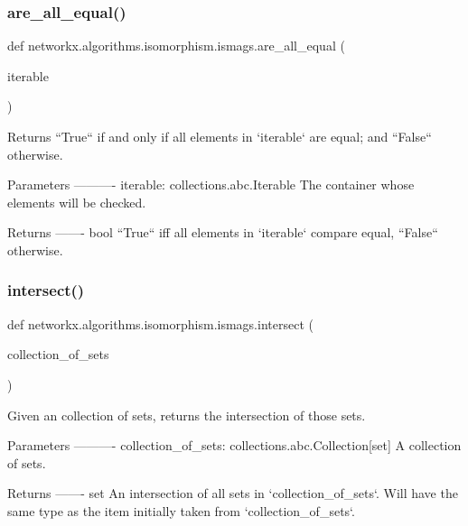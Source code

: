\subsubsection{\texorpdfstring{are\+\_\+all\+\_\+equal()}{are\_all\_equal()}}
{\footnotesize\ttfamily def networkx.\+algorithms.\+isomorphism.\+ismags.\+are\+\_\+all\+\_\+equal (\begin{DoxyParamCaption}\item[{}]{iterable }\end{DoxyParamCaption})}

\begin{DoxyVerb}Returns ``True`` if and only if all elements in `iterable` are equal; and
``False`` otherwise.

Parameters
----------
iterable: collections.abc.Iterable
    The container whose elements will be checked.

Returns
-------
bool
    ``True`` iff all elements in `iterable` compare equal, ``False``
    otherwise.
\end{DoxyVerb}
 \mbox{\label{namespacenetworkx_1_1algorithms_1_1isomorphism_1_1ismags_aac307ece4bd5b6920883130d6f3c1145}} 
\subsubsection{\texorpdfstring{intersect()}{intersect()}}
{\footnotesize\ttfamily def networkx.\+algorithms.\+isomorphism.\+ismags.\+intersect (\begin{DoxyParamCaption}\item[{}]{collection\+\_\+of\+\_\+sets }\end{DoxyParamCaption})}

\begin{DoxyVerb}Given an collection of sets, returns the intersection of those sets.

Parameters
----------
collection_of_sets: collections.abc.Collection[set]
    A collection of sets.

Returns
-------
set
    An intersection of all sets in `collection_of_sets`. Will have the same
    type as the item initially taken from `collection_of_sets`.
\end{DoxyVerb}
 \mbox{\label{namespacenetworkx_1_1algorithms_1_1isomorphism_1_1ismags_a8a0d10c0c3ce712095d568c54676d43b}} 
